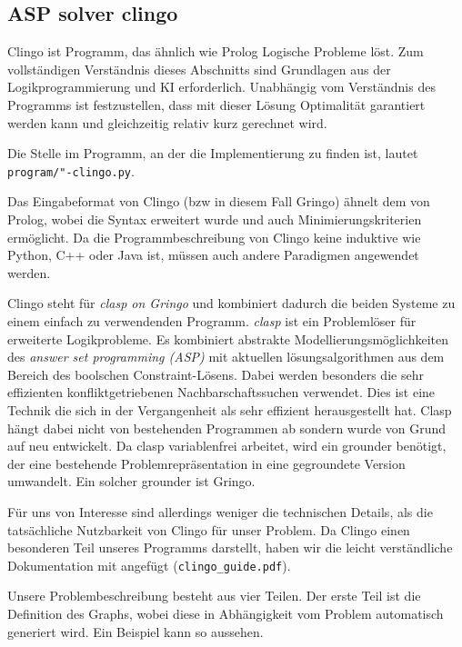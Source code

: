 \subsection{ASP solver clingo}

Clingo ist Programm, das ähnlich wie Prolog Logische Probleme löst. Zum vollständigen Verständnis dieses Abschnitts sind Grundlagen aus der Logikprogrammierung und KI erforderlich. Unabhängig vom Verständnis des Programms ist festzustellen, dass mit dieser Lösung Optimalität garantiert werden kann und gleichzeitig relativ kurz gerechnet wird. 

Die Stelle im Programm, an der die Implementierung zu finden ist, lautet \texttt{program/"-clingo.py}.

Das Eingabeformat von Clingo (bzw in diesem Fall Gringo) ähnelt dem von Prolog, wobei die Syntax erweitert wurde und auch Minimierungskriterien ermöglicht. Da die Programmbeschreibung von Clingo keine induktive wie Python, C++ oder Java ist, müssen auch andere Paradigmen angewendet werden. 

Clingo steht für \emph{clasp on Gringo} und kombiniert dadurch die beiden Systeme zu einem einfach zu verwendenden Programm. \emph{clasp} ist ein Problemlöser für erweiterte Logikprobleme. Es kombiniert abstrakte Modellierungsmöglichkeiten des \emph{answer set programming (ASP)} mit aktuellen lösungsalgorithmen aus dem Bereich des boolschen Constraint-Lösens. Dabei werden besonders die sehr effizienten konfliktgetriebenen Nachbarschaftssuchen verwendet. Dies ist eine Technik die sich in der Vergangenheit als sehr effizient herausgestellt hat. Clasp hängt dabei nicht von bestehenden Programmen ab sondern wurde von Grund auf neu entwickelt. Da clasp variablenfrei arbeitet, wird ein grounder benötigt, der eine bestehende Problemrepräsentation in eine gegroundete Version umwandelt. Ein solcher grounder ist Gringo. 

Für uns von Interesse sind allerdings weniger die technischen Details, als die tatsächliche Nutzbarkeit von Clingo für unser Problem. Da Clingo einen besonderen Teil unseres Programms darstellt, haben wir die leicht verständliche Dokumentation mit angefügt (\texttt{clingo\_guide.pdf}).

Unsere Problembeschreibung besteht aus vier Teilen. Der erste Teil ist die Definition des Graphs, wobei diese in Abhängigkeit vom Problem automatisch generiert wird. Ein Beispiel kann so aussehen.



